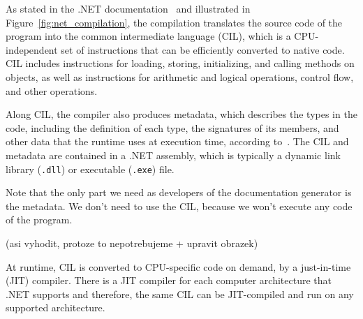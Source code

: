 As stated in the .NET documentation~\cite{dotnet_execution_model} and illustrated in Figure~\ref{fig:net_compilation}, 
the compilation translates the source code of the program into the common intermediate language (CIL), which is a CPU-independent set of instructions that can be efficiently converted to native code. 
CIL includes instructions for loading, storing, initializing, and calling methods on objects, as well as instructions for arithmetic and logical operations, control flow, and other operations.

Along CIL, the compiler also produces metadata, which describes the types in the code, including the definition of each type, the signatures of its members, and other data that the runtime uses at execution time, according to~\cite{dotnet_execution_model}.
The CIL and metadata are contained in a .NET assembly, which is typically a dynamic link library (\texttt{.dll}) or executable (\texttt{.exe}) file.

Note that the only part we need as developers of the documentation generator is the metadata.
We don't need to use the CIL, because we won't execute any code of the program.

\hfill

(asi vyhodit, protoze to nepotrebujeme + upravit obrazek)

At runtime, CIL is converted to CPU-specific code on demand, by a just-in-time (JIT) compiler. 
There is a JIT compiler for each computer architecture that .NET supports and therefore, the same CIL can be JIT-compiled and run on any supported architecture.

